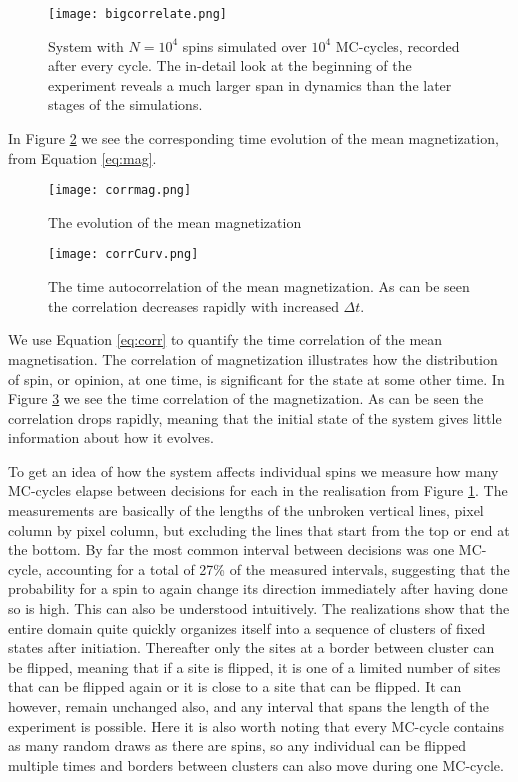 \documentclass[a4paper]{article}
\begin{document}
\begin{figure}[H]
 \centerline{\texttt{[image: bigcorrelate.png]}}
 \caption{System with $N=10^4$ spins simulated over $10^4$ MC-cycles, recorded after every cycle. The in-detail look at the beginning of the experiment reveals a much larger span in dynamics than the later stages of the simulations.}
 \label{fig:corr1}
\end{figure}

In Figure \ref{fig:corr2} we see the corresponding time evolution of the mean magnetization, from Equation \ref{eq:mag}. 

\begin{figure}[H]
 \centerline{\texttt{[image: corrmag.png]}}
 \caption{The evolution of the mean magnetization}
 \label{fig:corr2}
\end{figure}


\begin{figure}[H]
 \centerline{\texttt{[image: corrCurv.png]}}
 \caption{The time autocorrelation of the mean magnetization. As can be seen the correlation decreases rapidly with increased $\Delta t$. }
 \label{fig:corr3}
\end{figure}

 We use Equation \ref{eq:corr} to quantify the time correlation of the mean magnetisation. The correlation of magnetization illustrates how the distribution of spin, or opinion, at one time, is significant for the state at some other time. In Figure \ref{fig:corr3} we see the time correlation of the magnetization.  As can be seen the correlation drops rapidly, meaning that the initial state of the system gives little information about how it evolves. 

To get an idea of how the system affects individual spins we measure how many MC-cycles elapse between decisions for each in the realisation from Figure \ref{fig:corr1}. The measurements are basically of the lengths of the unbroken vertical lines, pixel column by pixel column, but excluding the lines that start from the top or end at the bottom. By far the most common interval between decisions was one MC-cycle, accounting for a total of 27\% of the measured intervals, suggesting that the probability for a spin to again change its direction immediately after having done so is high. This can also be understood intuitively. The realizations show that the entire domain quite quickly organizes itself into a sequence of clusters of fixed states after initiation. Thereafter only the sites at a border between cluster can be flipped, meaning that if a site is flipped, it is one of a limited number of sites that can be flipped again or it is close to a site that can be flipped. It can however, remain unchanged also, and any interval that spans the length of the experiment is possible. Here it is also worth noting that every MC-cycle contains as many random draws as there are spins, so any individual can be flipped multiple times and borders between clusters can also move during one MC-cycle.
\end{document}
